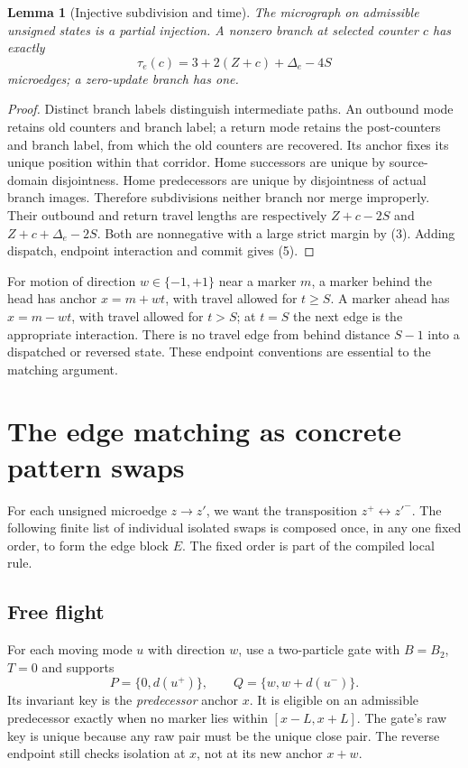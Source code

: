 \documentclass[11pt,a4paper]{article}
\numberwithin{equation}{section}
\newtheorem{lemma}[theorem]{Lemma}
\begin{document}
\begin{lemma}[Injective subdivision and time]\label{fpa:lem:subdivision}
The micrograph on admissible unsigned states is a partial injection. A
nonzero branch at selected counter $c$ has exactly
\[
 \tau_e(c)=3+2(Z+c)+\Delta_e-4S                         \tag{5}\label{fpa:eq:clock}
\]
microedges; a zero-update branch has one.
\end{lemma}
\begin{proof}
Distinct branch labels distinguish intermediate paths. An outbound mode
retains old counters and branch label; a return mode retains the post-counters
and branch label, from which the old counters are recovered. Its anchor fixes
its unique position within that corridor. Home successors are unique by
source-domain disjointness. Home predecessors are unique by disjointness of
actual branch images. Therefore subdivisions neither branch nor merge
improperly. Their outbound and return travel lengths are respectively
$Z+c-2S$ and $Z+c+\Delta_e-2S$. Both are nonnegative with a large strict margin
by (3). Adding dispatch, endpoint interaction and commit gives (5).
\end{proof}

For motion of direction $w\in\{-1,+1\}$ near a marker $m$, a marker behind
the head has anchor $x=m+wt$, with travel allowed for $t\ge S$. A marker ahead
has $x=m-wt$, with travel allowed for $t>S$; at $t=S$ the next edge is the
appropriate interaction. There is no travel edge from behind distance $S-1$
into a dispatched or reversed state. These endpoint conventions are essential
to the matching argument.

\section{The edge matching as concrete pattern swaps}\label{fpa:sec:edge}
For each unsigned microedge $z\to z'$, we want the transposition
$z^+\leftrightarrow z'^-$. The following finite list of individual isolated
swaps is composed once, in any one fixed order, to form the edge block $E$.
The fixed order is part of the compiled local rule.

\subsection{Free flight}
For each moving mode $u$ with direction $w$, use a two-particle gate with
$B=B_2$, $T=0$ and supports
\[
 P=\{0,d(u^+)\},\qquad Q=\{w,w+d(u^-)\}.              \tag{6}\label{fpa:eq:free}
\]
Its invariant key is the \emph{predecessor} anchor $x$. It is eligible on an
admissible predecessor exactly when no marker lies within $[x-L,x+L]$.
The gate's raw key is unique because any raw pair must be the unique close
pair. The reverse endpoint still checks isolation at $x$, not at its new
anchor $x+w$.
\end{document}
